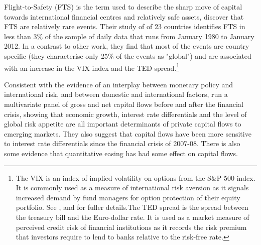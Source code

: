 \documentclass[12pt, a4paper, oneside]{article}\usepackage[]{graphicx}\usepackage[]{color}
\begin{document}
Flight-to-Safety (FTS) is the term used to describe the sharp move of capital towards international financial centres and relatively safe assets, \citet{FTS} discover that FTS are relatively rare events. Their study of of 23 countries identifies FTS in less than 3\% of the sample of daily data that runs from January 1980 to January 2012.  In a contrast to other work, they find that most of the events are country specific (they characterise only 25\% of the events as "global") and are associated with an increase in the VIX index and the TED spread.\footnote{The VIX is an index of implied volatility on options from the S\&P 500 index.  It is commonly used as a measure of international risk aversion as it signals increased demand by fund managers for option protection of their equity portfolio.  See \citet{VIX}, \citet{GoldmanVol} and \citet{Diamond} for fuller details.The TED spread is the spread between the treasury bill and the Euro-dollar rate.  It is used as a market measure of perceived credit risk of financial institutions as it records the risk premium that investors require to lend to banks relative to the risk-free rate.}   %


Consistent with the evidence of an interplay between monetary policy and international risk, and between domestic and international factors, \citet{Ahmed2014} run a multivariate panel of gross and net capital flows before and after the financial crisis, showing that economic growth, interest rate differentials and the level of global risk appetite are all important determinants of private capital flows to emerging markets.  They also suggest that capital flows have been more sensitive to interest rate differentials since the financial crisis of 2007-08. There is also some evidence that quantitative easing has had some effect on capital flows. 
\end{document}
